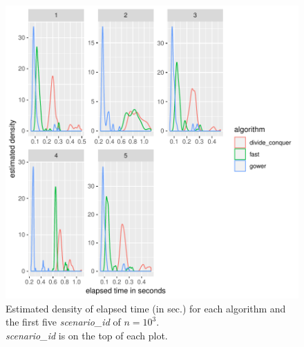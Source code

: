 \documentclass[11pt]{report}
\begin{document}
\begin{figure}[h]
\centering
    \includegraphics[scale=2]{./images/elapsed_time_1000_part1.pdf}
    \caption{
    Estimated density of elapsed time (in sec.) for each algorithm and 
    the first five \textit{scenario\_id} of $n=10^3$.\\
    \textit{scenario\_id} is on the top of each plot.
    }
    \label{elapsed_time_1000_part1}
\end{figure}
\end{document}
